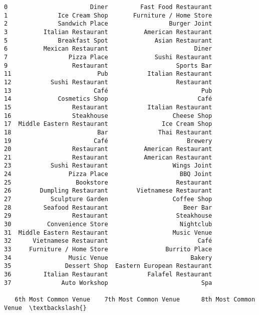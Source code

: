 \documentclass[11pt]{article}
\begin{document}
\begin{tcolorbox}[breakable, size=fbox, boxrule=.5pt, pad at break*=1mm, opacityfill=0]
\begin{Verbatim}[commandchars=\\\{\}]
0                       Diner         Fast Food Restaurant
1              Ice Cream Shop       Furniture / Home Store
2              Sandwich Place                 Burger Joint
3          Italian Restaurant          American Restaurant
5              Breakfast Spot             Asian Restaurant
6          Mexican Restaurant                        Diner
7                 Pizza Place             Sushi Restaurant
9                  Restaurant                   Sports Bar
11                        Pub           Italian Restaurant
12           Sushi Restaurant                   Restaurant
13                       Café                          Pub
14             Cosmetics Shop                         Café
15                 Restaurant           Italian Restaurant
16                 Steakhouse                  Cheese Shop
17  Middle Eastern Restaurant               Ice Cream Shop
18                        Bar              Thai Restaurant
19                       Café                      Brewery
20                 Restaurant          American Restaurant
21                 Restaurant          American Restaurant
23           Sushi Restaurant                  Wings Joint
24                Pizza Place                    BBQ Joint
25                  Bookstore                   Restaurant
26        Dumpling Restaurant        Vietnamese Restaurant
27           Sculpture Garden                  Coffee Shop
28         Seafood Restaurant                     Beer Bar
29                 Restaurant                   Steakhouse
30          Convenience Store                    Nightclub
31  Middle Eastern Restaurant                  Music Venue
32      Vietnamese Restaurant                         Café
33     Furniture / Home Store                Burrito Place
34                Music Venue                       Bakery
35               Dessert Shop  Eastern European Restaurant
36         Italian Restaurant           Falafel Restaurant
37              Auto Workshop                          Spa

   6th Most Common Venue    7th Most Common Venue      8th Most Common Venue  \textbackslash{}


\end{Verbatim}
\end{tcolorbox}
\end{document}
